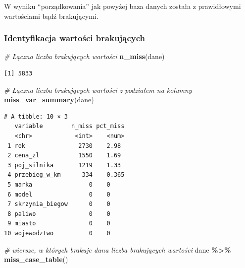 \documentclass[
]{article}
\newenvironment{Shaded}{\begin{snugshade}}{\end{snugshade}}
\newcommand{\CommentTok}[1]{\textcolor[rgb]{0.56,0.35,0.01}{\textit{#1}}}
\newcommand{\FunctionTok}[1]{\textcolor[rgb]{0.13,0.29,0.53}{\textbf{#1}}}
\newcommand{\NormalTok}[1]{#1}
\newcommand{\SpecialCharTok}[1]{\textcolor[rgb]{0.81,0.36,0.00}{\textbf{#1}}}
\newcommand{\StringTok}[1]{\textcolor[rgb]{0.31,0.60,0.02}{#1}}
\begin{document}
\begin{Shaded}
\end{Shaded}

W wyniku ``porządkowania'' jak powyżej baza danych została z
prawidłowymi wartościami bądź brakującymi.

\subsubsection{Identyfikacja wartości
brakujących}\label{identyfikacja-wartoux15bci-brakujux105cych}

\begin{Shaded}
\begin{Highlighting}[]
\CommentTok{\# Łączna liczba brakujących wartości}
\FunctionTok{n\_miss}\NormalTok{(dane)}
\end{Highlighting}
\end{Shaded}

\begin{verbatim}
[1] 5833
\end{verbatim}

\begin{Shaded}
\begin{Highlighting}[]
\CommentTok{\# Łączna liczba brakujących wartości z podziałem na kolumny}
\FunctionTok{miss\_var\_summary}\NormalTok{(dane)}
\end{Highlighting}
\end{Shaded}

\begin{verbatim}
# A tibble: 10 × 3
   variable        n_miss pct_miss
   <chr>            <int>    <num>
 1 rok               2730    2.98 
 2 cena_zl           1550    1.69 
 3 poj_silnika       1219    1.33 
 4 przebieg_w_km      334    0.365
 5 marka                0    0    
 6 model                0    0    
 7 skrzynia_biegow      0    0    
 8 paliwo               0    0    
 9 miasto               0    0    
10 wojewodztwo          0    0  
\end{verbatim}

\begin{Shaded}
\begin{Highlighting}[]
\CommentTok{\# wiersze, w których brakuje dana liczba brakujących wartości}
\NormalTok{dane }\SpecialCharTok{\%\textgreater{}\%} 
  \FunctionTok{miss\_case\_table}\NormalTok{()}
\end{Highlighting}
\end{Shaded}
\end{document}
